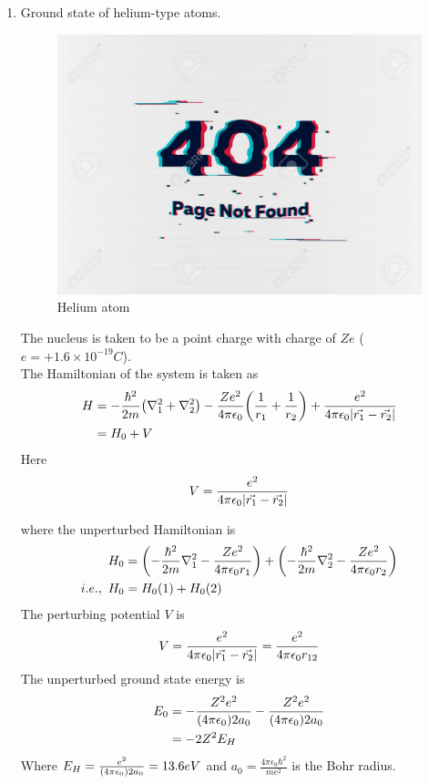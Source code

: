 \begin{enumerate}[label=Problem.\arabic*,start=1]
		
	
			
			\item Ground state of helium-type atoms.
			\begin{figure}
				\centering
				\includegraphics[width=0.5\linewidth]{Pictures/not-found.jpg}
				\caption{Helium atom}
			\end{figure}
			The nucleus is taken to be a point charge with charge of $Z e$ ($e=+1.6 \times 10^{-19} C$).\\
			The Hamiltonian of the system is taken as
			\begin{align}
				H &= -\frac{\hbar^2}{2 m} \qty(\nabla_1^2  +  \nabla_2^2) - \frac{Z e^2}{4 \pi \epsilon_0} \qty(\frac{1}{r_1} + \frac{1}{r_2}) + \frac{e^2}{4 \pi \epsilon_0 \abs{\vec{r_1} - \vec{r_2}}}\\
				&= H_0 + V
			\end{align}
			Here 
			\begin{equation}
			 	V = \frac{e^2}{4 \pi \epsilon_0 \abs{\vec{r_1} - \vec{r_2}}}
			\end{equation}
			
			where the unperturbed Hamiltonian is
			\begin{align*}
				H_0 &= \qty(-\frac{\hbar^2}{2 m} \nabla_1^2 - \frac{Z e^2}{4\pi \epsilon_0 r_1}) + \qty(-\frac{\hbar^2}{2 m} \nabla_2^2 - \frac{Z e^2}{4\pi \epsilon_0 r_2})\\
			i.e., \	H_0 &= H_0(1) + H_0(2)
			\end{align*}
			The perturbing potential $V$ is
			\begin{equation*}
				V = \frac{e^2}{4 \pi \epsilon_0 \abs{\vec{r_1} - \vec{r_2}}} = \frac{e^2}{4 \pi \epsilon_0 r_{1 2}}
			\end{equation*}
			The unperturbed ground state energy is
			\begin{align*}
				E_0 
				&= - \frac{Z^2 e^2}{\qty(4 \pi \epsilon_0) 2 a_0} - \frac{Z^2 e^2}{\qty(4 \pi \epsilon_0) 2 a_0}\\
				&= - 2 Z^2 E_H
			\end{align*}
			Where $E_H = \frac{e^2}{\qty(4 \pi \epsilon_0) 2 a_0} = 13.6 eV$ and $a_0 = \frac{4 \pi \epsilon_0  \hbar^2}{m e^2}$ is the Bohr radius.
			

\end{enumerate}
